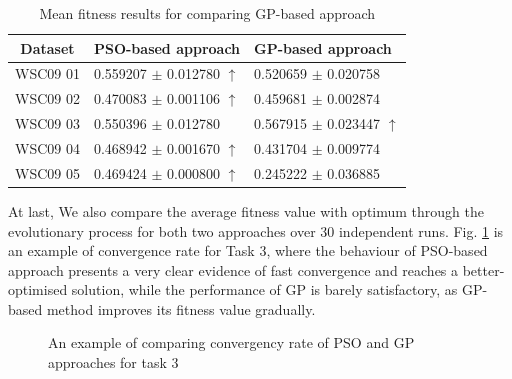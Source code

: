 \documentclass{IEEEtran}
\begin{document}
\begin{table}[]
\centering
\caption{Mean fitness results for comparing GP-based approach}
\label{meanFitness}
\begin{tabular}{l|l|l}
\hline
\multicolumn{1}{c|}{Dataset} & PSO-based approach & GP-based approach  \\ \hline
WSC09 01                     &0.559207 $\pm$ 0.012780  $\uparrow$   &0.520659 $\pm$ 0.020758           \\ \hline
WSC09 02                     &0.470083 $\pm$  0.001106 $\uparrow$   &0.459681 $\pm$  0.002874          \\ \hline
WSC09 03                     & 0.550396 $\pm$ 0.012780                        &0.567915 $\pm$ 0.023447 $\uparrow$   \\ \hline
WSC09 04                     & 0.468942 $\pm$ 0.001670  $\uparrow$   &0.431704 $\pm$ 0.009774            \\ \hline
WSC09 05                     & 0.469424 $\pm$ 0.000800  $\uparrow$   &0.245222 $\pm$ 0.036885            \\ \hline
\end{tabular}
\end{table}

At last, We also compare the average fitness value with optimum through the evolutionary process for both two approaches over 30 independent runs. Fig. \ref{psovsgp} is an example of convergence rate for Task 3, where the behaviour of PSO-based approach presents a very clear evidence of fast convergence and reaches a better-optimised solution, while the performance of GP is barely satisfactory, as GP-based method improves its fitness value gradually.


\begin{figure}[h]
\centering
{}
 \caption{An example of comparing convergency rate of PSO and GP approaches for task 3}
 \label{psovsgp}
\end{figure}
\end{document}
